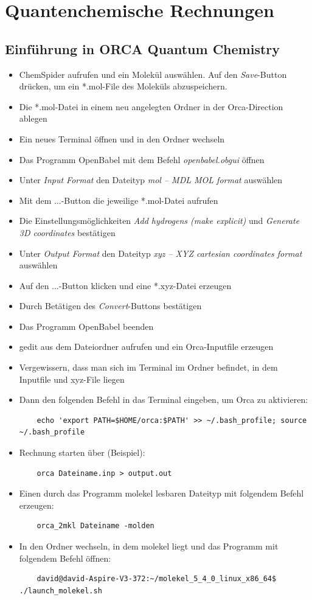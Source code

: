 \documentclass[9pt]{report}
\begin{document}
\chapter{Quantenchemische Rechnungen}

\section{Einführung in ORCA Quantum Chemistry}
\begin{itemize}
	\item ChemSpider aufrufen und ein Molekül auswählen. Auf den \textit{Save}-Button drücken, um ein *.mol-File des Moleküls abzuspeichern.
	\item Die *.mol-Datei in einem neu angelegten Ordner in der Orca-Direction ablegen
	\item Ein neues Terminal öffnen und in den Ordner wechseln
	\item Das Programm OpenBabel mit dem Befehl \textit{openbabel.obgui} öffnen
	\item Unter \textit{Input Format} den Dateityp \textit{mol -- MDL MOL format} auswählen
	\item Mit dem ...-Button die jeweilige *.mol-Datei aufrufen
	\item Die Einstellungsmöglichkeiten \textit{Add hydrogens (make explicit)} und \textit{Generate 3D coordinates} bestätigen
	\item Unter \textit{Output Format} den Dateityp \textit{xyz -- XYZ cartesian coordinates format} auswählen
	\item Auf den ...-Button klicken und eine *.xyz-Datei erzeugen
	\item Durch Betätigen des \textit{Convert}-Buttons bestätigen
	\item Das Programm OpenBabel beenden
	\item gedit aus dem Dateiordner aufrufen und ein Orca-Inputfile erzeugen
	\item Vergewissern, dass man sich im Terminal im Ordner befindet, in dem Inputfile und xyz-File liegen
	\item Dann den folgenden Befehl in das Terminal eingeben, um Orca zu aktivieren: \begin{verbatim}
	echo 'export PATH=$HOME/orca:$PATH' >> ~/.bash_profile; source ~/.bash_profile
	\end{verbatim}
	\item Rechnung starten über (Beispiel):
	\begin{verbatim}
	orca Dateiname.inp > output.out
	\end{verbatim}
	\item Einen durch das Programm molekel lesbaren Dateityp mit folgendem Befehl erzeugen: \begin{verbatim}
	orca_2mkl Dateiname -molden
	\end{verbatim}
	\item In den Ordner wechseln, in dem molekel liegt und das Programm mit folgendem Befehl öffnen:
	\begin{verbatim}
	david@david-Aspire-V3-372:~/molekel_5_4_0_linux_x86_64$ ./launch_molekel.sh
	\end{verbatim}
\end{itemize}
\end{document}
